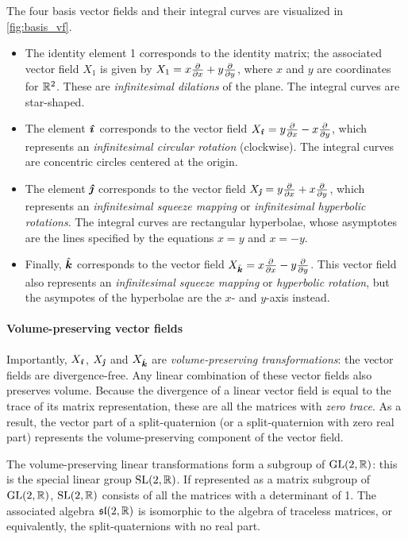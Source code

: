 The four basis vector fields and their integral curves are visualized in \cref{fig:basis_vf}.
\begin{itemize}
    \item The identity element 1 corresponds to the identity matrix; the associated vector field $X_1$ is given by $X_1 = x\pdv{}{x} + y\pdv{}{y}$, where $x$ and $y$ are coordinates for $\real^2$. These are \emph{infinitesimal dilations} of the plane. The integral curves are star-shaped.
    \item The element $\quati$ corresponds to the vector field $X_{\quati} = y\pdv{}{x} - x\pdv{}{y}$, which represents an \emph{infinitesimal circular rotation} (clockwise). The integral curves are concentric circles centered at the origin.
    \item The element $\quatj$ corresponds to the vector field $X_{\quatj} = y\pdv{x} + x\pdv{}{y}$, which represents an \emph{infinitesimal squeeze mapping} or \emph{infinitesimal hyperbolic rotations}. The integral curves are rectangular hyperbolae, whose asymptotes are the lines specified by the equations $x = y$ and $x = -y$.  
    \item Finally, $\quatk$ corresponds to the vector field $X_{\quatk} = x\pdv{x} - y\pdv{}{y}$. This vector field also represents an \emph{infinitesimal squeeze mapping} or \emph{hyperbolic rotation}, but the asympotes of the hyperbolae are the $x$- and $y$-axis instead.
\end{itemize}

\paragraph{Volume-preserving vector fields}
Importantly, $X_{\quati}$, $X_{\quatj}$ and $X_{\quatk}$ are \emph{volume-preserving transformations}: the vector fields are divergence-free. Any linear combination of these vector fields also preserves volume. Because the divergence of a linear vector field is equal to the trace of its matrix representation, these are all the matrices with \emph{zero trace}. As a result, the vector part of a split-quaternion (or a split-quaternion with zero real part) represents the volume-preserving component of the vector field. 

The volume-preserving linear transformations form a subgroup of $\glgroup{2}{\real}$: this is the special linear group $\slgroup{2}{\real}$. If represented as a matrix subgroup of $\glgroup{2}{\real}$, $\slgroup{2}{\real}$ consists of all the matrices with a determinant of 1. The associated algebra $\slalg{2}{\real}$ is isomorphic to the algebra of traceless matrices, or equivalently, the split-quaternions with no real part.

